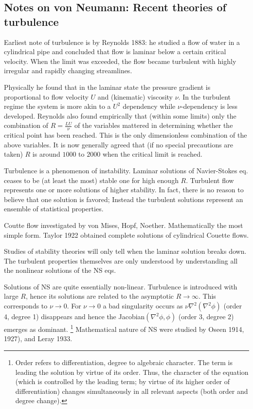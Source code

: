 \documentclass[usenatbib,twocolumn]{aastex63}
\begin{document}
\clearpage
\begin{appendix}

\section{Notes on von Neumann: Recent theories of turbulence}

Earliest note of turbulence is by Reynolds 1883:
he studied a flow of water in a cylindrical pipe and concluded that flow is laminar below a certain critical velocity.
When the limit was exceeded, the flow became turbulent with highly irregular and rapidly changing streamlines.

Physically he found that in the laminar state the pressure gradient is proportional to flow velocity $U$ and (kinematic) viscosity $\nu$.
In the turbulent regime the system is more akin to a $U^2$ dependency while $\nu$-dependency is less developed.
Reynolds also found empirically that (within some limits) only the combination of $R = \frac{L U}{\nu}$ of the variables mattered in determining whether the critical point has been reached.
This is the only dimensionless combination of the above variables.
It is now generally agreed that (if no special precautions are taken) $R$ is around $1000$ to $2000$ when the critical limit is reached.

Turbulence is a phenomenon of instability.
Laminar solutions of Navier-Stokes eq. ceases to be (at least the most) stable one for high enough $R$.
Turbulent flow represents one or more solutions of higher stability.
In fact, there is no reason to believe that one solution is favored; 
Instead the turbulent solutions represent an ensemble of statistical properties.

Coutte flow investigated by von Mises, Hopf, Noether.
Mathematically the most simple form.
Taylor 1922 obtained complete solutions of cylindrical Couette flows.

Studies of stability theories will only tell when the laminar solution breaks down.
The turbulent properties themselves are only understood by understanding all the nonlinear solutions of the NS eqs.

Solutions of NS are quite essentially non-linear.
Turbulence is introduced with large $R$, hence its solutions are related to the asymptotic $R \rightarrow \infty$.
This corresponds to $\nu \rightarrow 0$.
For $\nu \rightarrow 0$ a bad singularity occurs as $\nu \nabla^2 (\nabla^2 \phi)$ (order 4, degree 1) disappears and hence the Jacobian$(\nabla^2 \phi, \phi)$ (order 3, degree 2) emerges as dominant.
\footnote{
    Order refers to differentiation, degree to algebraic character.
    The term is leading the solution by virtue of its order.
    Thus, the character of the equation (which is controlled by the leading term; by virtue of its higher order of differentiation) changes simultaneously in all relevant aspects (both order and degree change).
}
Mathematical nature of NS were studied by Oseen 1914, 1927), and Leray 1933.


\end{appendix}
\end{document}
